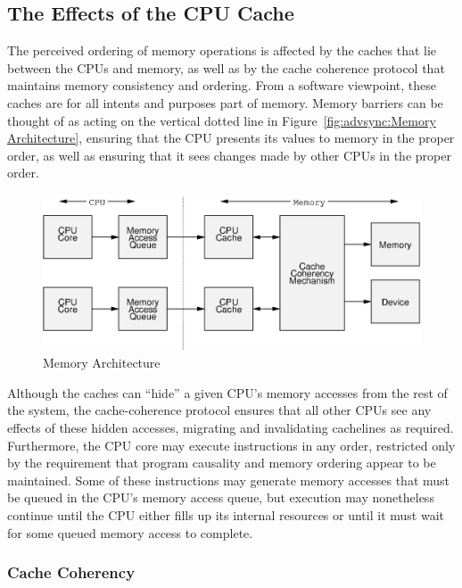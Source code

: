 \subsection{The Effects of the CPU Cache}
\label{sec:advsync:The Effects of the CPU Cache}

The perceived ordering of memory operations is affected by the caches
that lie between the CPUs and memory, as well as by the cache coherence
protocol that maintains memory consistency and ordering.
From a software viewpoint, these caches are for all intents and purposes
part of memory.
Memory barriers can be thought of as acting on the vertical dotted line in
Figure~\ref{fig:advsync:Memory Architecture}, ensuring that the CPU
presents its values to memory in the proper order, as well as ensuring
that it sees changes made by other CPUs in the proper order.

\begin{figure}[htb]
\centering
\includegraphics{advsync/MemoryArchitecture}
\caption{Memory Architecture}
\end{figure}

Although the caches can ``hide'' a given CPU's memory accesses from the rest of
the system, the cache-coherence protocol ensures that all other CPUs see
any effects of these hidden accesses, migrating and invalidating cachelines
as required.
Furthermore, the CPU core may execute instructions in any order, restricted
only by the requirement that program causality and memory ordering
appear to be maintained.
Some of these instructions may generate memory accesses that must be queued
in the CPU's memory access queue, but execution may nonetheless continue
until the CPU either fills up its internal resources or until it must
wait for some queued memory access to complete.

\subsubsection{Cache Coherency}
\label{sec:advsync:Cache Coherency}

